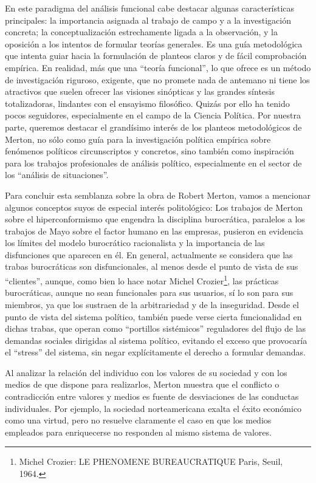 \documentclass[
]{book}
\begin{document}
En este paradigma del análisis funcional cabe destacar algunas características principales: la importancia asignada al trabajo de campo y a la investigación concreta; la conceptualización estrechamente ligada a la observación, y la oposición a los intentos de formular teorías generales. Es una guía metodológica que intenta guiar hacia la formulación de planteos claros y de fácil comprobación empírica. En realidad, más que una ``teoría funcional'', lo que ofrece es un método de investigación riguroso, exigente, que no promete nada de antemano ni tiene los atractivos que suelen ofrecer las visiones sinópticas y las grandes síntesis totalizadoras, lindantes con el ensayismo filosófico. Quizás por ello ha tenido pocos seguidores, especialmente en el campo de la Ciencia Política. Por nuestra parte, queremos destacar el grandísimo interés de los planteos metodológicos de Merton, no sólo como guía para la investigación política empírica sobre fenómenos políticos circunscriptos y concretos, sino también como inspiración para los trabajos profesionales de análisis político, especialmente en el sector de los ``análisis de situaciones''.

Para concluir esta semblanza sobre la obra de Robert Merton, vamos a mencionar algunos conceptos suyos de especial interés politológico: Los trabajos de Merton sobre el hiperconformismo que engendra la disciplina burocrática, paralelos a los trabajos de Mayo sobre el factor humano en las empresas, pusieron en evidencia los límites del modelo burocrático racionalista y la importancia de las disfunciones que aparecen en él. En general, actualmente se considera que las trabas burocráticas son disfuncionales, al menos desde el punto de vista de sus ``clientes'', aunque, como bien lo hace notar Michel Crozier\footnote{Michel Crozier: LE PHENOMENE BUREAUCRATIQUE Paris, Seuil, 1964.}, las prácticas burocráticas, aunque no sean funcionales para sus usuarios, sí lo son para sus miembros, ya que los sustraen de la arbitrariedad y de la inseguridad. Desde el punto de vista del sistema político, también puede verse cierta funcionalidad en dichas trabas, que operan como ``portillos sistémicos'' reguladores del flujo de las demandas sociales dirigidas al sistema político, evitando el exceso que provocaría el ``stress'' del sistema, sin negar explícitamente el derecho a formular demandas.

Al analizar la relación del individuo con los valores de su sociedad y con los medios de que dispone para realizarlos, Merton muestra que el conflicto o contradicción entre valores y medios es fuente de desviaciones de las conductas individuales. Por ejemplo, la sociedad norteamericana exalta el éxito económico como una virtud, pero no resuelve claramente el caso en que los medios empleados para enriquecerse no responden al mismo sistema de valores.
\end{document}
